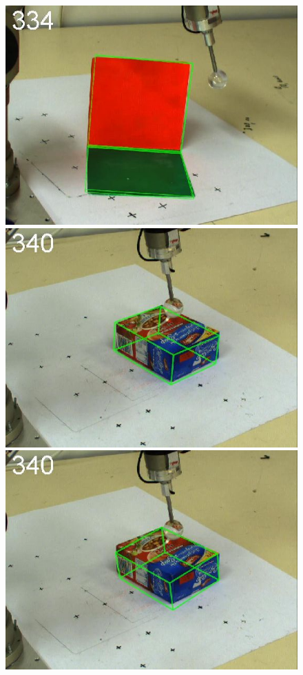 \begin{figure}[htbp]
{\includegraphics[width=\imgAXwid]{./A1_2exp_876_5}
\includegraphics[width=\imgAXwid]{./A2_2exp_399_5}
\includegraphics[width=\imgAXwid]{./A2_LWPR1_399_5}
}
\end{figure}

